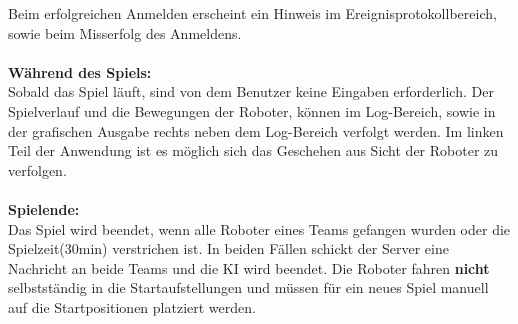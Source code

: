 Beim erfolgreichen Anmelden erscheint ein Hinweis im Ereignisprotokollbereich, sowie beim Misserfolg des Anmeldens.
\\\\
\textbf{Während des Spiels:}\\
Sobald das Spiel läuft, sind von dem Benutzer keine Eingaben erforderlich. 
Der Spielverlauf und die Bewegungen der Roboter, können im Log-Bereich, sowie in der grafischen Ausgabe rechts neben dem Log-Bereich verfolgt werden.
Im linken Teil der Anwendung ist es möglich sich das Geschehen aus Sicht der Roboter zu verfolgen.
\\\\
\textbf{Spielende:}\\
Das Spiel wird beendet, wenn alle Roboter eines Teams gefangen wurden oder die Spielzeit(30min) verstrichen ist.
In beiden Fällen schickt der Server eine Nachricht an beide Teams und die KI wird beendet.
Die Roboter fahren \textbf{nicht} selbstständig in die Startaufstellungen und müssen für ein neues Spiel manuell auf die Startpositionen platziert werden.
